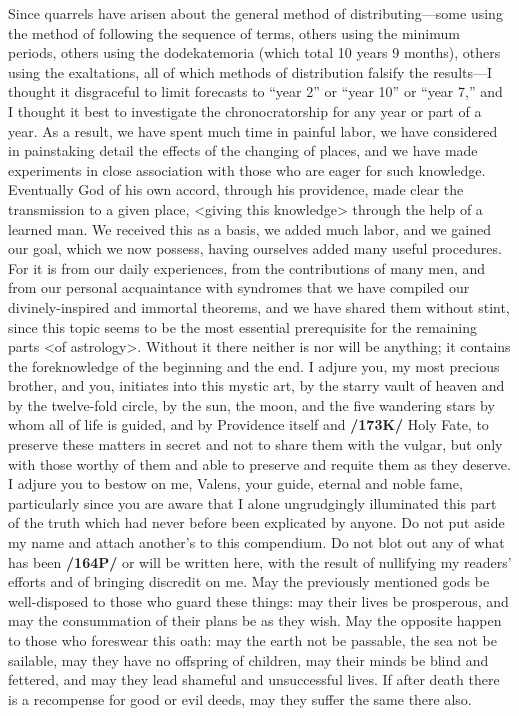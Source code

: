 Since quarrels have arisen about the general method of distributing—some using the method of following the sequence of terms, others using the minimum periods, others using the dodekatemoria (which total 10 years 9 months), others using the exaltations, all of which methods of distribution falsify the results—I thought it disgraceful to limit forecasts to “year 2” or “year 10” or “year 7,” and I thought it best to investigate the chronocratorship for any year or part of a year. As a result, we have spent much time in painful labor, we have considered in painstaking detail the effects of the changing of places, and we have made experiments in close association with those who are eager for such knowledge. Eventually God of his own accord, through his providence, made clear the transmission to a given place, <giving this
knowledge> through the help of a learned man. We received this as a basis, we added much labor, and we gained our goal, which we now possess, having ourselves added many useful procedures. For it is from our daily experiences, from the contributions of many men, and from our personal acquaintance with syndromes that we have compiled our divinely-inspired and immortal theorems, and we have shared them without stint, since this topic seems to be the most essential prerequisite for the remaining parts <of astrology>. Without it there neither is nor will be anything; it contains the foreknowledge of the beginning and the end. I adjure you, my most precious brother, and you, initiates into this mystic art, by the starry vault of heaven and by the twelve-fold circle, by the sun, the moon, and the five wandering stars by whom all of life is guided, and by Providence itself and \textbf{/173K/} Holy Fate, to preserve these matters in secret and not to
share them with the vulgar, but only with those worthy of them and able to preserve and requite them as they deserve. I adjure you to bestow on me, Valens, your guide, eternal and noble fame, particularly since you are aware that I alone ungrudgingly illuminated this part of the truth which had never before been explicated by anyone. Do not put aside my name and attach another’s to this compendium. Do not blot
out any of what has been \textbf{/164P/} or will be written here, with the result of nullifying my readers’ efforts and
of bringing discredit on me. May the previously mentioned gods be well-disposed to those who guard these things: may their lives be prosperous, and may the consummation of their plans be as they wish. May the opposite happen to those who foreswear this oath: may the earth not be passable, the sea not be sailable, may they have no offspring of children, may their minds be blind and fettered, and may they lead shameful and unsuccessful lives. If after death there is a recompense for good or evil deeds, may they suffer the same there also.

